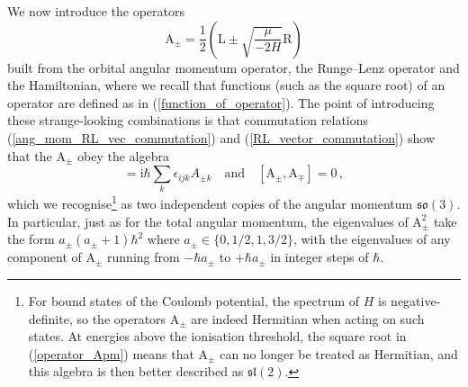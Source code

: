 \documentclass{article}
\theoremstyle{plain}\theoremheaderfont{\normalfont\itshape}\theorembodyfont{\rmfamily}\theoremseparator{.}\newtheorem*{rem}{Remark}\newtheorem*{ex}{Example}\newtheorem*{proof}{Proof}\newtheorem*{altp}{Alternative proof}
\theoremstyle{plain}\theoremheaderfont{\normalfont\bfseries}\theorembodyfont{\rmfamily}\theoremseparator{.}\newtheorem{thm}{Theorem}[section]\newtheorem{lem}[thm]{Lemma}\newtheorem{prop}[thm]{Proposition}\newtheorem*{cor}{Corollary}\newtheorem{defn}[thm]{Definition}\newtheorem{clm}[thm]{Claim}\newtheorem{clminproof}{Claim}
\theoremstyle{break}\theoremheaderfont{\normalfont\itshape}\theorembodyfont{\rmfamily}\theoremseparator{.\medskip}\newtheorem*{proofskip}{Proof}\newtheorem*{exs}{Examples}\newtheorem*{rems}{Remarks}
\theoremstyle{break}\theoremheaderfont{\normalfont\bfseries}\theorembodyfont{\rmfamily}\theoremseparator{.\medskip}\newtheorem{lemskip}[thm]{Lemma}\newtheorem{defnskip}[thm]{Definition}\newtheorem{propskip}[thm]{Proposition}\newtheorem{thmskip}[thm]{Theorem}
\numberwithin{equation}{section}
\newcommand{\ii}{\mathrm{i}}
\newcommand{\vb}[1]{\bm{\mathrm{#1}}}
\begin{document}
    We now introduce the operators
    \begin{equation}\label{operator_Apm}
        \vb{A}_{\pm}=\frac{1}{2}\left(\vb{L}\pm\sqrt{\frac{\mu}{-2H}}\vb{R}\right)
    \end{equation}
    built from the orbital angular momentum operator, the Runge--Lenz operator and the Hamiltonian, where we recall that functions (such as the square root) of an operator are defined as in (\ref{function_of_operator}). The point of introducing these strange-looking combinations is that commutation relations (\ref{ang_mom_RL_vec_commutation}) and (\ref{RL_vector_commutation}) show that the \(\vb{A}_\pm\) obey the algebra
    \begin{equation}
        [A_{\pm i},A_{\pm j}]=\ii\hbar\sum_k \epsilon_{ijk} A_{\pm k}\quad\text{and}\quad [\vb{A}_{\pm},\vb{A}_{\mp}]=0\,,
    \end{equation}
    which we recognise\footnote{For bound states of the Coulomb potential, the spectrum of \(H\) is negative-definite, so the operators \(\vb{A}_{\pm}\) are indeed Hermitian when acting on such states. At energies above the ionisation threshold, the square root in (\ref{operator_Apm}) means that \(\vb{A}_{\pm}\) can no longer be treated as Hermitian, and this algebra is then better described as \(\mathfrak{sl}(2)\).} as two independent copies of the angular momentum \(\mathfrak{so}(3)\). In particular, just as for the total angular momentum, the eigenvalues of \(\vb{A}_{\pm}^2\) take the form \(a_\pm(a_\pm +1)\hbar^2\) where \(a_{\pm}\in\{0,1/2,1,3/2\}\), with the eigenvalues of any component of \(\vb{A}_\pm\) running from \(-\hbar a_{\pm}\) to \(+\hbar a_{\pm}\) in integer steps of \(\hbar\).
\end{document}
